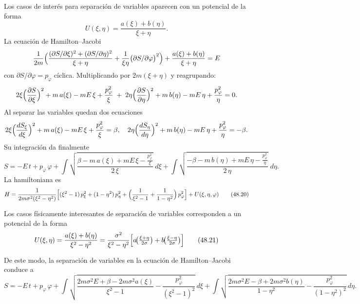 \documentclass[12pt]{article}
\begin{document}
Los casos de interés para separación de variables aparecen con un potencial de la forma
\begin{equation}
U(\xi,\eta)=\frac{a(\xi)+b(\eta)}{\xi+\eta}.
\tag{48.15}
\end{equation}
La ecuación de Hamilton–Jacobi
\[
\frac{1}{2m}\Bigl(\frac{(\partial S/\partial\xi)^2+(\partial S/\partial\eta)^2}{\xi+\eta}
+\frac{1}{\xi\eta}\bigl(\partial S/\partial\varphi\bigr)^2\Bigr)
+\frac{a(\xi)+b(\eta)}{\xi+\eta}
=E
\]
con \(\partial S/\partial\varphi=p_\varphi\) cíclica. Multiplicando por \(2m(\xi+\eta)\) y reagrupando:
\[
2\xi\Bigl(\frac{\partial S}{\partial\xi}\Bigr)^2 + m\,a(\xi)-mE\,\xi + \frac{p_\varphi^2}{\xi}
\;+\;
2\eta\Bigl(\frac{\partial S}{\partial\eta}\Bigr)^2 + m\,b(\eta)-mE\,\eta + \frac{p_\varphi^2}{\eta}
=0.
\]
Al separar las variables quedan dos ecuaciones
\[
2\xi\Bigl(\frac{dS_\xi}{d\xi}\Bigr)^2 + m\,a(\xi)-mE\,\xi + \frac{p_\varphi^2}{\xi} = \beta,
\quad
2\eta\Bigl(\frac{dS_\eta}{d\eta}\Bigr)^2 + m\,b(\eta)-mE\,\eta + \frac{p_\varphi^2}{\eta} = -\beta.
\]
Su integración da finalmente
\begin{equation}
S = -E\,t + p_\varphi\,\varphi
+\int \sqrt{\frac{\beta - m\,a(\xi) + mE\,\xi - \tfrac{p_\varphi^2}{\xi}}{2\,\xi}}\;d\xi
+\int \sqrt{\frac{-\beta - m\,b(\eta) + mE\,\eta - \tfrac{p_\varphi^2}{\eta}}{2\,\eta}}\;d\eta.
\tag{48.16}
\end{equation}
\noindent La hamiltoniana es
\begin{equation}
H = \frac{1}{2m\sigma^{2}(\xi^{2}-\eta^{2})}
\Bigl[
(\xi^{2}-1)\,p_{\xi}^{2} + (1-\eta^{2})\,p_{\eta}^{2}
+ \Bigl(\frac{1}{\xi^{2}-1} + \frac{1}{1-\eta^{2}}\Bigr)\,p_{\varphi}^{2}
\Bigr]
+ U(\xi,\eta,\varphi)
\tag{48.20}
\end{equation}

\noindent Los casos físicamente interesantes de separación de variables corresponden a un potencial de la forma
\begin{equation}
U(\xi,\eta)
= \frac{a(\xi)+b(\eta)}{\xi^{2}-\eta^{2}}
= \frac{\sigma^{2}}{\xi^{2}-\eta^{2}}
\Bigl[
a\!\bigl(\tfrac{\xi+\eta}{2\sigma}\bigr)
+ b\!\bigl(\tfrac{\xi-\eta}{2\sigma}\bigr)
\Bigr]
\tag{48.21}
\end{equation}

\noindent De este modo, la separación de variables en la ecuación de Hamilton–Jacobi conduce a
\begin{equation}
S = -E\,t + p_{\varphi}\,\varphi
+ \int 
\sqrt{
\frac{2m\sigma^{2}E + \beta - 2m\sigma^{2}a(\xi)}{\xi^{2}-1}
- \frac{p_{\varphi}^{2}}{(\xi^{2}-1)^{2}}
}
\,d\xi
+ \int 
\sqrt{
\frac{2m\sigma^{2}E - \beta + 2m\sigma^{2}b(\eta)}{1-\eta^{2}}
- \frac{p_{\varphi}^{2}}{(1-\eta^{2})^{2}}
}
\,d\eta.
\tag{48.22}
\end{equation}
\end{document}
